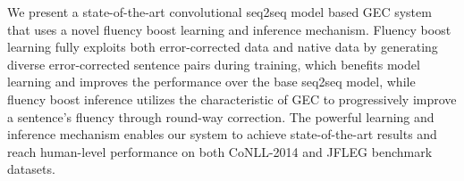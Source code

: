 \documentclass{article} \usepackage{MSRA_TR,times}
\begin{document}
We present a state-of-the-art convolutional seq2seq model based GEC system that uses a novel fluency boost learning and inference mechanism. Fluency boost learning fully exploits both error-corrected data and native data by generating diverse error-corrected sentence pairs during training, which benefits model learning and improves the performance over the base seq2seq model, while fluency boost inference utilizes the characteristic of GEC to progressively improve a sentence's fluency through round-way correction. The powerful learning and inference mechanism enables our system to achieve state-of-the-art results and reach human-level performance on both CoNLL-2014 and JFLEG benchmark datasets.


\end{document}
